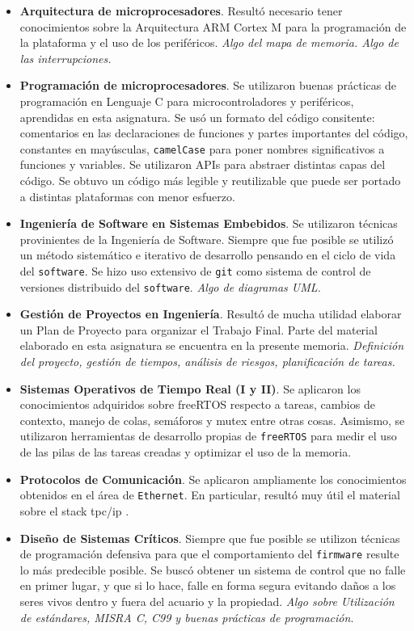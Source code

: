 \begin{itemize}
\item
\textbf{Arquitectura de microprocesadores}. Resultó necesario tener conocimientos sobre la Arquitectura ARM Cortex M para la programación de la plataforma  y el uso de los periféricos.  \textit{Algo del mapa de memoria. Algo de las interrupciones.}

\item
\textbf{Programación de microprocesadores}. Se utilizaron buenas prácticas de programación en Lenguaje C para microcontroladores y periféricos, aprendidas en esta asignatura. Se usó un formato del código consitente: comentarios en las declaraciones de funciones y partes importantes del código, constantes en mayúsculas, \texttt{camelCase} para poner nombres significativos a funciones y variables. Se utilizaron APIs para abstraer distintas capas del código. Se obtuvo un código más legible y reutilizable que puede ser portado a distintas plataformas con menor esfuerzo.

\item
\textbf{Ingeniería de Software en Sistemas Embebidos}. Se utilizaron técnicas provinientes de la Ingeniería de Software. Siempre que fue posible se utilizó un método sistemático e iterativo de desarrollo pensando en el ciclo de vida del \texttt{software}. Se hizo uso extensivo de \texttt{git} como sistema de control de versiones distribuido del \texttt{software}.  \textit{Algo de diagramas UML.}

\item
\textbf{Gestión de Proyectos en Ingeniería}. Resultó de mucha utilidad elaborar un Plan de Proyecto para organizar el Trabajo Final.  Parte del material elaborado en esta asignatura se encuentra en la presente memoria. \textit{Definición del proyecto, gestión de tiempos, análisis de riesgos, planificación de tareas.}

\item
\textbf{Sistemas Operativos de Tiempo Real (I y II)}. Se aplicaron los conocimientos adquiridos sobre freeRTOS respecto a tareas, cambios de contexto, manejo de colas, semáforos y mutex entre otras cosas.  Asimismo, se utilizaron herramientas de desarrollo propias de \texttt{freeRTOS} para medir el uso de las pilas de las tareas creadas y optimizar el uso de la memoria.

\item 
\textbf{Protocolos de Comunicación}. Se aplicaron ampliamente los conocimientos obtenidos en el área de \texttt{Ethernet}. En particular, resultó muy útil el material sobre el stack tpc/ip .

\item
\textbf{Diseño de Sistemas Críticos}. Siempre que fue posible se utilizon técnicas de programación defensiva para que el comportamiento del \texttt{firmware} resulte lo más predecible posible.  Se buscó obtener un sistema de control que no falle en primer lugar, y que si lo hace, falle en forma segura evitando daños a los seres vivos dentro y fuera del acuario y la propiedad. \textit{Algo sobre Utilización de estándares, MISRA C, C99 y buenas prácticas de programación}.
\end{itemize}



